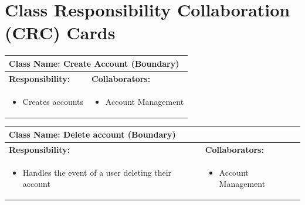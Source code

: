 \documentclass[]{article}
\begin{document}

	
\section{Class Responsibility Collaboration (CRC) Cards}
\label{sec:class_responsibility_collaboration_crc_cards}

\begin{table}[H]
	\centering
	\begin{tabular}{|p{7cm}|p{7cm}|}
	\hline 
	 \multicolumn{2}{|l|}{\textbf{Class Name:} Create Account (Boundary)} \\
	\hline
	\textbf{Responsibility:} & \textbf{Collaborators:} \\
	\hline
	\raggedright
	\begin{itemize}
		\item Creates accounts
	\end{itemize}
	\vspace{1in} & 
	\begin{itemize}
		\item Account Management
	\end{itemize} \\
	\hline
	\end{tabular}
\end{table}

\begin{table}[H]
	\centering
	\begin{tabular}{|p{7cm}|p{7cm}|}
	\hline 
	 \multicolumn{2}{|l|}{\textbf{Class Name:} Delete account (Boundary)} \\
	\hline
	\textbf{Responsibility:} & \textbf{Collaborators:} \\
	\hline
	\raggedright
	\begin{itemize}
		\item Handles the event of a user deleting their account
	\end{itemize}
	\vspace{1in} & 
	\begin{itemize}
		\item Account Management
	\end{itemize} \\
	\hline
	\end{tabular}
\end{table}
\end{document}
